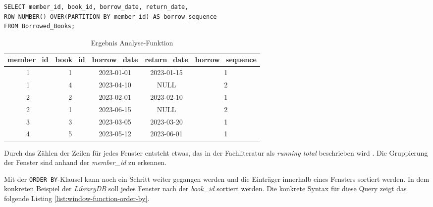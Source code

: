 \begin{lstlisting}
SELECT member_id, book_id, borrow_date, return_date,
ROW_NUMBER() OVER(PARTITION BY member_id) AS borrow_sequence
FROM Borrowed_Books;
\end{lstlisting}
\begin{table}[h]
	\centering
	\begin{tabular}{|c|c|c|c|c|}
		\hline
		\textbf{member\_id} & \textbf{book\_id} & \textbf{borrow\_date} & \textbf{return\_date} & \textbf{borrow\_sequence} \\
		\hline
		1                   & 1                 & 2023-01-01            & 2023-01-15            & 1                         \\
		\hline
		1                   & 4                 & 2023-04-10            & NULL                  & 2                         \\
		\hline
		2                   & 2                 & 2023-02-01            & 2023-02-10            & 1                         \\
		\hline
		2                   & 1                 & 2023-06-15            & NULL                  & 2                         \\
		\hline
		3                   & 3                 & 2023-03-05            & 2023-03-20            & 1                         \\
		\hline
		4                   & 5                 & 2023-05-12            & 2023-06-01            & 1                         \\
		\hline
	\end{tabular}
	\caption{Ergebnis Analyse-Funktion}
	\label{tab:ergebnnis_analyse_funktion}
\end{table}

Durch das Zählen der Zeilen für jedes Fenster entsteht etwas, das in der Fachliteratur
als \textit{running total} beschrieben wird \citep[vgl.][S. 37]{Nuijten2023}.
Die Gruppierung der Fenster sind anhand der \textit{member\_id} zu erkennen.

Mit der \texttt{ORDER BY}-Klausel kann noch ein Schritt weiter gegangen werden
und die Einträger innerhalb eines Fensters sortiert werden. In dem konkreten Beispiel
der \textit{LibraryDB} soll jedes Fenster nach der \textit{book\_id} sortiert werden.
Die konkrete Syntax für diese Query zeigt das folgende Listing \ref{list:window-function-order-by}.

